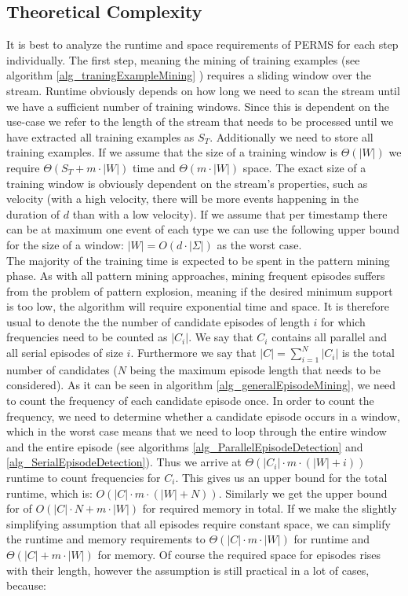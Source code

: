 \subsection{Theoretical Complexity}
\label{subsec_permsComplexity}
It is best to analyze the runtime and space requirements of PERMS for each step individually. The first step, meaning the mining of training examples (see algorithm \ref{alg_traningExampleMining} ) requires a sliding window over the stream. Runtime obviously depends on how long we need to scan the stream until we have a sufficient number of training windows. Since this is dependent on the use-case we refer to the length of the stream that needs to be processed until we have extracted all training examples as $S_T$. Additionally we need to store all training examples. If we assume that the size of a training window is $\Theta(|W|)$ we require $\Theta(S_T + m\cdot |W|)$ time and $\Theta(m\cdot |W|)$ space. The exact size of a training window is obviously dependent on the stream's properties, such as velocity (with a high velocity, there will be more events happening in the duration of $d$ than with a low velocity). If we assume that per timestamp there can be at maximum one event of each type we can use the following upper bound for the size of a window: $|W| = O(d\cdot |\Sigma|)$ as the worst case. \\
The majority of the training time is expected to be spent in the pattern mining phase. As with all pattern mining approaches, mining frequent episodes suffers from the problem of pattern explosion, meaning if the desired minimum support is too low, the algorithm will require exponential time and space. It is therefore usual to denote the the number of candidate episodes of length $i$ for which frequencies need to be counted as $|C_i|$. We say that $C_i$ contains all parallel and all serial episodes of size $i$. Furthermore we say that $|C| = \sum_{i=1}^N |C_i|$ is the total number of candidates ($N$ being the maximum episode length that needs to be considered). As it can be seen in algorithm \ref{alg_generalEpisodeMining}, we need to count the frequency of each candidate episode once. In order to count the frequency, we need to determine whether a candidate episode occurs in a window, which in the worst case means that we need to loop through the entire window and the entire episode (see algorithms \ref{alg_ParallelEpisodeDetection} and \ref{alg_SerialEpisodeDetection}). Thus we arrive at $\Theta(|C_i| \cdot m \cdot(|W| + i))$ runtime to count frequencies for $C_i$. This gives us an upper bound for the total runtime, which is: $O(|C| \cdot m \cdot(|W| + N))$. Similarly we get the upper bound for of $O(|C|\cdot N + m \cdot |W|)$ for required memory in total. If we make the slightly simplifying assumption that all episodes require constant space, we can simplify the runtime and memory requirements to $\Theta(|C| \cdot m \cdot |W| )$ for runtime and $\Theta(|C| + m \cdot |W|)$ for memory. Of course the required space for episodes rises with their length, however the assumption is still practical in a lot of cases, because:

